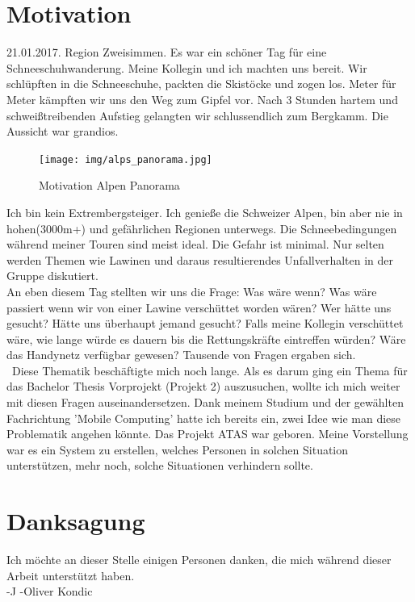 \documentclass[11pt,english,german]{report}
\theoremstyle{definition}
\begin{document}
\chapter*{Motivation}
21.01.2017. Region Zweisimmen. Es war ein schöner Tag für eine Schneeschuhwanderung. Meine Kollegin und ich machten uns bereit. Wir schlüpften in die Schneeschuhe, packten die Skistöcke und zogen los. Meter für Meter kämpften wir uns den Weg zum Gipfel vor. Nach 3 Stunden hartem und schweißtreibenden Aufstieg gelangten wir schlussendlich zum Bergkamm. Die Aussicht war grandios.
\begin{figure}[H]
	\centering
	\texttt{[image: img/alps\_panorama.jpg]}
	\caption[Motvation Alpen Panorama]
	{Motivation Alpen Panorama}
\end{figure}
\noindent
Ich bin kein Extrembergsteiger. Ich genieße die Schweizer Alpen, bin aber nie in hohen(3000m+) und gefährlichen Regionen unterwegs. Die Schneebedingungen während meiner Touren sind meist ideal. Die Gefahr ist minimal. Nur selten werden Themen wie Lawinen und daraus resultierendes Unfallverhalten in der Gruppe diskutiert.\\[0.3cm]
An eben diesem Tag stellten wir uns die Frage: Was wäre wenn? Was wäre passiert wenn wir von einer Lawine verschüttet worden wären? Wer hätte uns gesucht? Hätte uns überhaupt jemand gesucht? Falls meine Kollegin verschüttet wäre, wie lange würde es dauern bis die Rettungskräfte eintreffen würden? Wäre das Handynetz verfügbar gewesen? Tausende von Fragen ergaben sich.\\[0.3cm]\
Diese Thematik beschäftigte mich noch lange. Als es darum ging ein Thema für das Bachelor Thesis Vorprojekt (Projekt 2) auszusuchen, wollte ich mich weiter mit diesen Fragen auseinandersetzen. Dank meinem Studium und der gewählten Fachrichtung 'Mobile Computing' hatte ich bereits ein, zwei Idee wie man diese Problematik angehen könnte. Das Projekt ATAS war geboren. Meine Vorstellung war es ein System zu erstellen, welches Personen in solchen Situation unterstützen, mehr noch, solche Situationen verhindern sollte.\\[0.3cm]

\chapter*{Danksagung}
Ich möchte an dieser Stelle einigen Personen danken, die mich während dieser Arbeit unterstützt haben.\\[0.3cm]

-J
-Oliver Kondic
\end{document}
